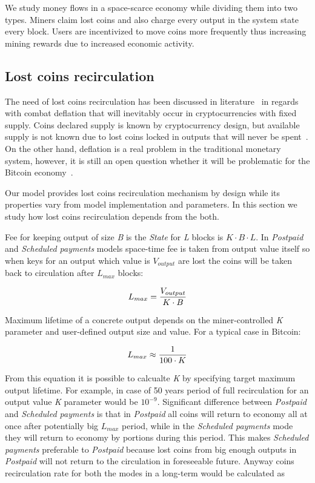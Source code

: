 \documentclass[]{article}   %
\newcommand{\state}{\textit{State}}
\begin{document}
We study money flows in a space-scarce economy while dividing them into two types. Miners claim lost coins and also charge every output in the system state every block. Users are incentivized to move coins more frequently thus increasing mining rewards due to increased economic activity.  

\subsection{Lost coins recirculation}
\label{sec:re}

The need of lost coins recirculation has been discussed in literature~\cite{gjermundrod2014recirculating, gjermundrod2016going} in regards with combat deflation that will inevitably occur in cryptocurrencies with fixed supply. Coins declared supply is known by cryptocurrency design, but available supply is not known due to lost coins locked in outputs that will never be spent~\cite{ron2013quantitative}. On the other hand, deflation is a real problem in the traditional monetary system, however, it is still an open question whether it will be problematic for the Bitcoin economy~\cite{bitcoinDeflationarySpiral, barber2012bitter}.


Our model provides lost coins recirculation mechanism by design while its properties vary from model implementation and parameters. In this section we study how lost coins recirculation depends from the both.

Fee for keeping output of size \textit{B} is the \state{} for \textit{L} blocks is ${K \cdot B \cdot L}$. In \textit{Postpaid} and \textit{Scheduled payments} models space-time fee is taken from output value itself so when keys for an output which value is \textit{$V_{output}$} are lost the coins will be taken back to circulation after \textit{$L_{max}$} blocks: 

\begin{equation}
{L_{max} = {V_{output} \over K \cdot B}}
\end{equation}

Maximum lifetime of a concrete output depends on the miner-controlled \textit{K} parameter and user-defined output size and value. For a typical case in Bitcoin:

\begin{equation}
{L_{max} \approx {1 \over 100 \cdot K}}
\end{equation}

From this equation it is possible to calcualte \textit{K} by specifying target maximum output lifetime. For example, in case of 50 years period of full recirculation for an output value \textit{K} parameter would be $10^{-9}$. Significant difference between \textit{Postpaid} and \textit{Scheduled payments} is that in \textit{Postpaid} all coins will return to economy all at once after potentially big $L_{max}$ period, while in the \textit{Scheduled payments} mode they will return to economy by portions during this period. This makes \textit{Scheduled payments} preferable to \textit{Postpaid} because lost coins from big enough outputs in \textit{Postpaid} will not return to the circulation in foreseeable future. Anyway coins recirculation rate for both the modes in a long-term would be calculated as
\end{document}
